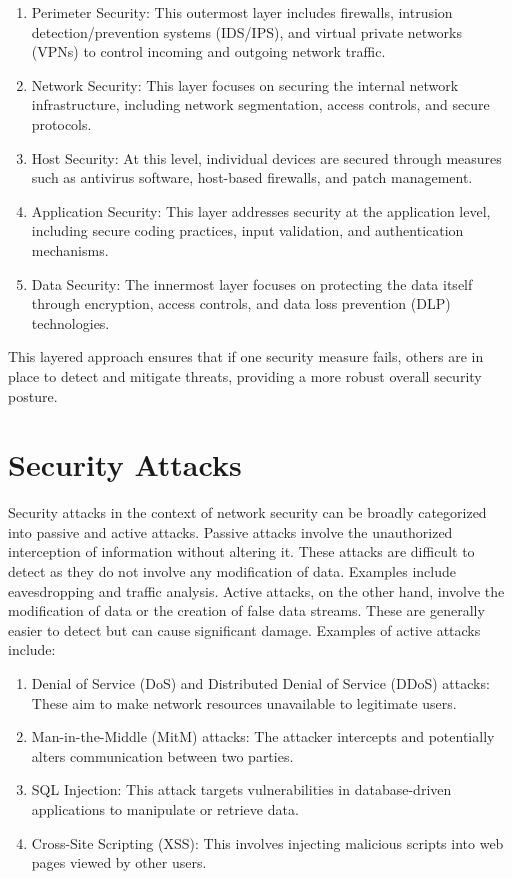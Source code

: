 \documentclass{article}
\begin{document}
\begin{enumerate}
    \item Perimeter Security: This outermost layer includes firewalls, intrusion detection/prevention systems (IDS/IPS), and virtual private networks (VPNs) to control incoming and outgoing network traffic.
    \item Network Security: This layer focuses on securing the internal network infrastructure, including network segmentation, access controls, and secure protocols.
    \item Host Security: At this level, individual devices are secured through measures such as antivirus software, host-based firewalls, and patch management.
    \item Application Security: This layer addresses security at the application level, including secure coding practices, input validation, and authentication mechanisms.
    \item Data Security: The innermost layer focuses on protecting the data itself through encryption, access controls, and data loss prevention (DLP) technologies.
\end{enumerate}

This layered approach ensures that if one security measure fails, others are in place to detect and mitigate threats, providing a more robust overall security posture.

\section{Security Attacks}

Security attacks in the context of network security can be broadly categorized into passive and active attacks. Passive attacks involve the unauthorized interception of information without altering it. These attacks are difficult to detect as they do not involve any modification of data. Examples include eavesdropping and traffic analysis. Active attacks, on the other hand, involve the modification of data or the creation of false data streams. These are generally easier to detect but can cause significant damage. Examples of active attacks include:

\begin{enumerate}
    \item Denial of Service (DoS) and Distributed Denial of Service (DDoS) attacks: These aim to make network resources unavailable to legitimate users.
    \item Man-in-the-Middle (MitM) attacks: The attacker intercepts and potentially alters communication between two parties.
    \item SQL Injection: This attack targets vulnerabilities in database-driven applications to manipulate or retrieve data.
    \item Cross-Site Scripting (XSS): This involves injecting malicious scripts into web pages viewed by other users.
\end{enumerate}
\end{document}
